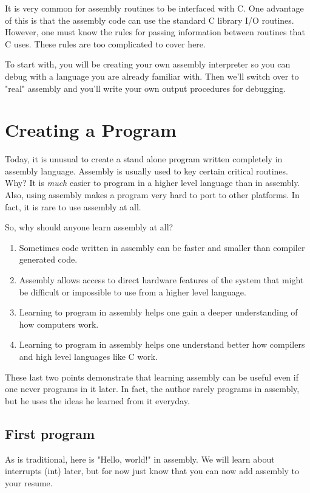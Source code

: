 It is very common for assembly routines to be interfaced with C. One
advantage of this is that the assembly code can use the standard C
library I/O routines.  However, one must know the rules for passing
information between routines that C uses. These rules are too
complicated to cover here. 

To start with, you will be creating your own assembly interpreter so you can
debug with a language you are already familiar with.  Then we'll switch over
to "real" assembly and you'll write your own output procedures for debugging.

\section{Creating a Program}

Today, it is unusual to create a stand alone program written
completely in assembly language. Assembly is usually used to key certain
critical routines. Why? It is \emph{much} easier to program in a higher level
language than in assembly. Also, using assembly makes a program very hard to
port to other platforms. In fact, it is rare to use assembly at all.

So, why should anyone learn assembly at all?
\begin{enumerate}
\item Sometimes code written in assembly can be faster and smaller than
      compiler generated code.
\item Assembly allows access to direct hardware features of the system that
      might be difficult or impossible to use from a higher level language.
\item Learning to program in assembly helps one gain a deeper understanding of
      how computers work.
\item Learning to program in assembly helps one understand better how compilers
      and high level languages like C work.
\end{enumerate}
These last two points demonstrate that learning assembly can be useful even if
one never programs in it later. In fact, the author rarely programs in
assembly, but he uses the ideas he learned from it everyday.

\subsection{First program}

As is traditional, here is "Hello, world!" in assembly.  We will learn about interrupts ({\code int})
later, but for now just know that you can now add assembly to your resume.


